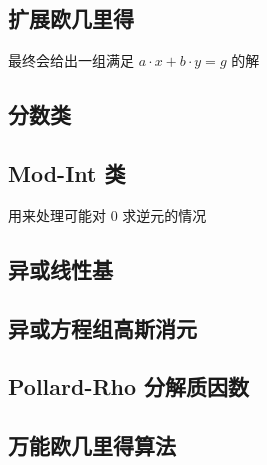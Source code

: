 \documentclass[12pt]{article}
\begin{document}
\newpage

\subsection{扩展欧几里得}

最终会给出一组满足 $a\cdot x+b\cdot y=g$ 的解



\subsection{分数类}



\newpage

\subsection{Mod-Int 类}

用来处理可能对 0 求逆元的情况



\newpage

\subsection{异或线性基}



\newpage

\subsection{异或方程组高斯消元}



\newpage

\subsection{Pollard-Rho 分解质因数}



\newpage

\subsection{万能欧几里得算法}
\end{document}
